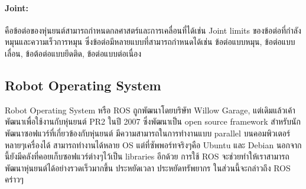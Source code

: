 \paragraph*{Joint:}
คือข้อต่อของหุ่นยนต์สามารถกำหนดกลศาสตร์และการเคลื่อนที่ได้เช่น Joint limits ของข้อต่อที่กำลังหมุนและความเร็วการหมุน ซึ่งข้อต่อมีหลายแบบที่สามารถกำหนดได้เช่น ข้อต่อแบบหมุน, ข้อต่อแบบเลื่อน, ข้อต้อต่อแบบยึดติด, ข้อต่อแบบต่อเนื่อง

\clearpage
\subsection{Robot Operating System}
Robot Operating System หรือ ROS ถูกพัฒนาโดยบริษัท Willow Garage, แต่เดิมแล้วเค้าพัฒนาเพื่อใช้งานกับหุ่นยนต์ PR2 ในปี 2007
ซึ่งพัฒนาเป็น open source framework สำหรับนักพัฒนาซอฟแวร์ที่เกี่ยวข้องกับหุ่นยนต์ มีความสามารถในการทำงานแบบ parallel
บนคอมพิวเตอร์หลายๆเครื่องได้ สามารถทำงานได้หลาย OS แต่ที่ซัพพอร์ทจริงๆคือ Ubuntu และ Debian นอกจากนี้ยังมีคลังที่คอยเก็บซอฟแวร์ต่างๆไว้เป็น
libraries อีกด้วย การใช้ ROS จะช่วยทำให้เราสามารถพัฒนาหุ่นยนต์ได้อย่างรวดเร็วมากขึ้น ประหยัดเวลา ประหยัดทรัพยากร
ในส่วนนี้จะกล่าวถึง ROS คร่าวๆ

